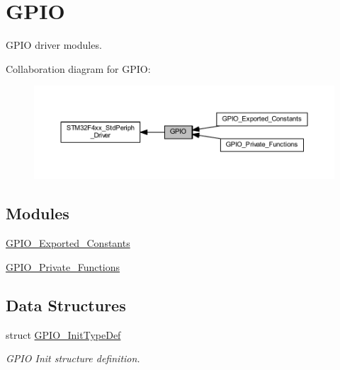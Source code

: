 \hypertarget{group___g_p_i_o}{}\section{G\+P\+IO}
\label{group___g_p_i_o}


G\+P\+IO driver modules.  


Collaboration diagram for G\+P\+IO\+:
\nopagebreak
\begin{figure}[H]
\begin{center}
\leavevmode
\includegraphics[width=350pt]{group___g_p_i_o}
\end{center}
\end{figure}
\subsection*{Modules}
\begin{DoxyCompactItemize}
\item 
\hyperlink{group___g_p_i_o___exported___constants}{G\+P\+I\+O\+\_\+\+Exported\+\_\+\+Constants}
\item 
\hyperlink{group___g_p_i_o___private___functions}{G\+P\+I\+O\+\_\+\+Private\+\_\+\+Functions}
\end{DoxyCompactItemize}
\subsection*{Data Structures}
\begin{DoxyCompactItemize}
\item 
struct \hyperlink{struct_g_p_i_o___init_type_def}{G\+P\+I\+O\+\_\+\+Init\+Type\+Def}
\begin{DoxyCompactList}\small\item\em G\+P\+IO Init structure definition. \end{DoxyCompactList}\end{DoxyCompactItemize}
